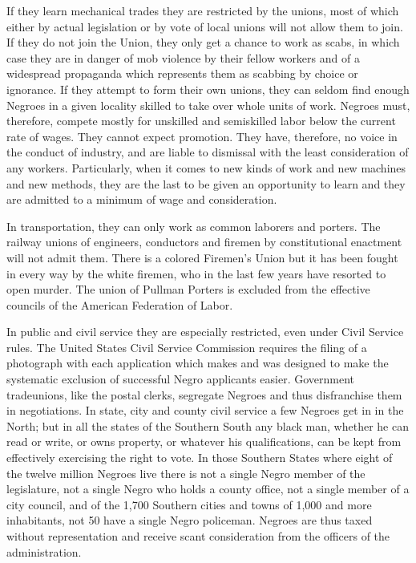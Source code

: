 \documentclass[letterpaper,10pt,english]{jupyterBook}
\begin{document}
\sphinxAtStartPar
If they learn mechanical trades they are restricted by the unions, most of which either by actual legislation or by vote of local unions will not allow them to join. If they do not join the Union, they only get a chance to work as scabs, in which case they are in danger of mob violence by their fellow workers and of a widespread propaganda which represents them as scabbing by choice or ignorance. If they attempt to form their own unions, they can seldom find enough Negroes in a given locality skilled to take over whole units of work. Negroes must, therefore, compete mostly for unskilled and semi\sphinxhyphen{}skilled labor below the current rate of wages. They cannot expect promotion. They have, therefore, no voice in the conduct of industry, and are liable to dismissal with the least consideration of any workers. Particularly, when it comes to new kinds of work and new machines and new methods, they are the last to be given an opportunity to learn and they are admitted to a minimum of wage and consideration.

\sphinxAtStartPar
In transportation, they can only work as common laborers and porters. The railway unions of engineers, conductors and firemen by constitutional enactment will not admit them. There is a colored Firemen’s Union but it has been fought in every way by the white firemen, who in the last few years have resorted to open murder. The union of Pullman Porters is excluded from the effective councils of the American Federation of Labor.

\sphinxAtStartPar
In public and civil service they are especially restricted, even under Civil Service rules. The United States Civil Service Commission requires the filing of a photograph with each application which makes and was designed to make the systematic exclusion of successful Negro applicants easier. Government trade\sphinxhyphen{}unions, like the postal clerks, segregate Negroes and thus disfranchise them in negotiations. In state, city and county civil service a few Negroes get in in the North; but in all the states of the Southern South any black man, whether he can read or write, or owns property, or whatever his qualifications, can be kept from effectively exercising the right to vote. In those Southern States where eight of the twelve million Negroes live there is not a single Negro member of the legislature, not a single Negro who holds a county office, not a single member of a city council, and of the 1,700 Southern cities and towns of 1,000 and more inhabitants, not 50 have a single Negro policeman. Negroes are thus taxed without representation and receive scant consideration from the officers of the administration.
\end{document}
